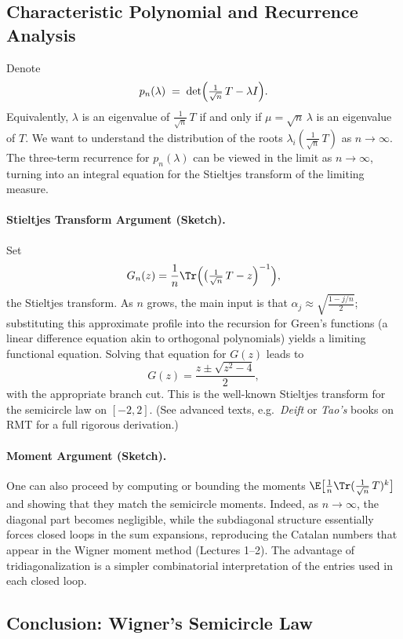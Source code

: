 \documentclass[letterpaper,11pt,oneside,reqno]{article}
\numberwithin{equation}{section}
\theoremstyle{definition}
\begin{document}
\subsection{Characteristic Polynomial and Recurrence Analysis}

Denote
\[
  p_n(\lambda) \;=\;
  \det\Bigl(\tfrac1{\sqrt{n}}\,T - \lambda I\Bigr).
\]
Equivalently, $\lambda$ is an eigenvalue of $\frac{1}{\sqrt{n}}\,T$ if and only if $\mu = \sqrt{n}\,\lambda$ is an eigenvalue of $T$. We want to understand the distribution of the roots $\lambda_i(\frac{1}{\sqrt{n}}\,T)$ as $n\to\infty$. The three-term recurrence for $p_n(\lambda)$ can be viewed in the limit as $n\to\infty$, turning into an integral equation for the Stieltjes transform of the limiting measure.

\paragraph{Stieltjes Transform Argument (Sketch).}
Set
\[
  G_n(z)
  = \frac{1}{n}\Tr\Bigl(\bigl(\tfrac{1}{\sqrt{n}}\,T - z\Bigr)^{-1}\Bigr),
\]
the Stieltjes transform. As $n$ grows, the main input is that $\alpha_j\approx \sqrt{\frac{1-j/n}{2}}$; substituting this approximate profile into the recursion for Green’s functions (a linear difference equation akin to orthogonal polynomials) yields a limiting functional equation. Solving that equation for $G(z)$ leads to
\[
  G(z) = \frac{z \pm \sqrt{z^2-4}}{2},
\]
with the appropriate branch cut. This is the well-known Stieltjes transform for the semicircle law on $[-2,2]$. (See advanced texts, e.g.\ \emph{Deift} or \emph{Tao’s} books on RMT for a full rigorous derivation.)

\paragraph{Moment Argument (Sketch).}
One can also proceed by computing or bounding the moments $\E\bigl[\frac{1}{n}\Tr(\frac{1}{\sqrt{n}}\,T)^k\bigr]$ and showing that they match the semicircle moments. Indeed, as $n\to\infty$, the diagonal part becomes negligible, while the subdiagonal structure essentially forces closed loops in the sum expansions, reproducing the Catalan numbers that appear in the Wigner moment method (Lectures 1--2). The advantage of tridiagonalization is a simpler combinatorial interpretation of the entries used in each closed loop.

\subsection{Conclusion: Wigner’s Semicircle Law}
\end{document}
